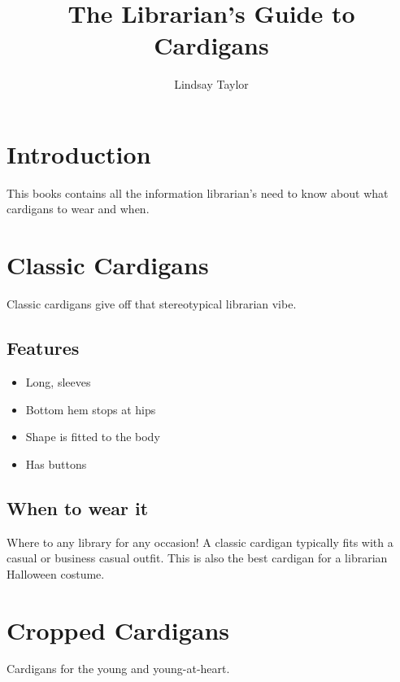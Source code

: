 \documentclass[
  openany]{book}
\title{The Librarian's Guide to Cardigans}
\author{Lindsay Taylor}
\date{}
\providecommand{\tightlist}{%
  \setlength{\itemsep}{0pt}\setlength{\parskip}{0pt}}
\begin{document}
\maketitle

{
\setcounter{tocdepth}{1}
\tableofcontents
}
\hypertarget{introduction}{%
\chapter{Introduction}\label{introduction}}

This books contains all the information librarian's need to know about what cardigans to wear and when.

\hypertarget{classic-cardigans}{%
\chapter{Classic Cardigans}\label{classic-cardigans}}

Classic cardigans give off that stereotypical librarian vibe.

\hypertarget{features}{%
\section{Features}\label{features}}

\begin{itemize}
\tightlist
\item
  Long, sleeves
\item
  Bottom hem stops at hips
\item
  Shape is fitted to the body
\item
  Has buttons
\end{itemize}

\hypertarget{when-to-wear-it}{%
\section{When to wear it}\label{when-to-wear-it}}

Where to any library for any occasion! A classic cardigan typically fits with a casual or business casual outfit. This is also the best cardigan for a librarian Halloween costume.

\hypertarget{cropped-cardigans}{%
\chapter{Cropped Cardigans}\label{cropped-cardigans}}

Cardigans for the young and young-at-heart.
\end{document}
